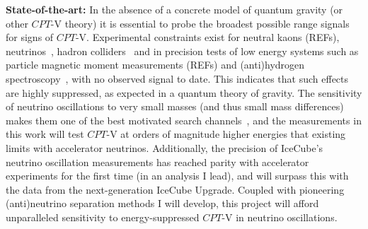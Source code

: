 \documentclass[a4paper,11pt]{article}
\begin{document}
\noindent \textbf{State-of-the-art:} In the absence of a concrete model of quantum gravity (or other $CPT$-V theory) it is essential to probe the broadest possible range signals~\cite{hep-ph/9809542} for signs of $CPT$-V. Experimental constraints exist for neutral kaons (REFs), neutrinos~\cite{Adamson:2013whj, Ohlsson:2014cha}, hadron colliders~\cite{vanTilburg:2016awx} and in precision tests of low energy systems such as particle magnetic moment measurements (REFs) and (anti)hydrogen spectroscopy~\cite{Kostelecky:2015nma}, with no observed signal to date. This indicates that such effects are highly suppressed, as expected in a quantum theory of gravity.  The sensitivity of neutrino oscillations to very small masses (and thus small mass differences) makes them one of the best motivated search channels~\cite{PhysRevD.99.075022}, and the measurements in this work will test $CPT$-V at orders of magnitude higher energies that existing limits with accelerator neutrinos. Additionally, the precision of IceCube's neutrino oscillation measurements has reached parity with accelerator experiments for the first time (in an analysis I lead), and will surpass this with the data from the next-generation IceCube Upgrade. Coupled with pioneering (anti)neutrino separation methods I will develop, this project will afford unparalleled sensitivity to energy-suppressed $CPT$-V in neutrino oscillations. \\


\end{document}
